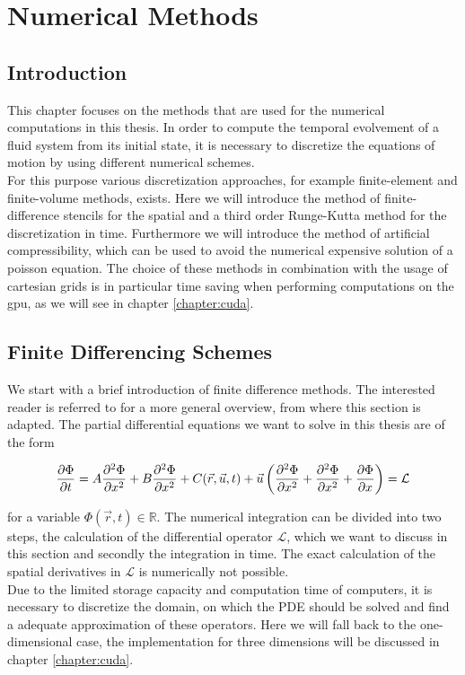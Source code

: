 \chapter{Numerical Methods}

\section{Introduction}

This chapter focuses on the methods that are used for the numerical computations in this thesis.
In order to compute the temporal evolvement of a fluid system from its initial state, it is necessary to discretize
the equations of motion by using different numerical schemes.\\
For this purpose various discretization approaches, for example finite-element and finite-volume methods, exists.
Here we will introduce the method of finite-difference stencils for the spatial and a third order Runge-Kutta method for the discretization in time.
Furthermore we will introduce the method of artificial compressibility, which can be used to avoid the numerical expensive solution of a poisson equation.
The choice of these methods in combination with the usage of cartesian grids is in particular time saving when performing computations on the gpu, as we
will see in chapter \ref{chapter:cuda}.

\section{Finite Differencing Schemes}

We start with a brief introduction of finite difference methods.
The interested reader is referred to \citep{ferziger99} for a more general overview, from where this section is adapted.
The partial differential equations we want to solve in this thesis are of the form

\begin{align}
    \label{numerik:pde_allg}
    \pdn[\Phi]{t} = A \pdn[^2\Phi]{x^2}  + B \pdn[^2\Phi]{x^2}     + C(\vec{r}, \vec{u}, t) +  \vec{u}\left(\pdn[^2\Phi]{x^2} +  \pdn[^2\Phi]{x^2} + \pdn[\Phi]{x}\right) = \mathcal{L}
\end{align}

for a variable $\Phi(\vec{r}, t)\in\mathbb{R}$.
The numerical integration can be divided into two steps, the calculation of the differential operator $\mathcal{L}$, which we want to discuss in this
section and secondly the integration in time.
The exact calculation of the spatial derivatives in $\mathcal{L}$ is numerically not possible.\\
Due to the limited storage capacity and computation time of computers,
it is necessary to discretize the domain, on which the PDE should be solved and find a adequate approximation of these operators.
Here we will fall back to the  one-dimensional case, the implementation for three dimensions will be discussed in chapter \ref{chapter:cuda}.\\

